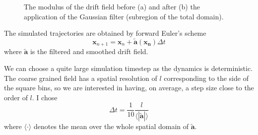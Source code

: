 \documentclass[a4paper]{article}
\begin{document}
\begin{figure}[htbp] \label{fig:filtering}
  \caption{The modulus of the drift field before (a) and after (b) the application of the Gaussian filter (subregion of the total domain).}
\end{figure}

The simulated trajectories are obtained by forward Euler's scheme
\begin{equation}
\bm{x}_{n+1} = \bm{x}_n + \bm{\tilde{a}}(\bm{x_n})\Delta t
\end{equation}
where $\bm{\tilde{a}}$ is the filtered and smoothed drift field.

We can choose a quite large simulation timestep as the dynamics is deterministic. The coarse grained field has a spatial resolution of $l$ corresponding to the side of the square bins, so we are interested in having, on average, a step size close to the order of $l$. I chose
\begin{equation}
\Delta t = \frac{1}{10} \frac{l}{\langle|\bm{\tilde{a}}|\rangle}
\end{equation}
where $\langle\cdot\rangle$ denotes the mean over the whole spatial domain of $\bm{\tilde{a}}$.
\end{document}
